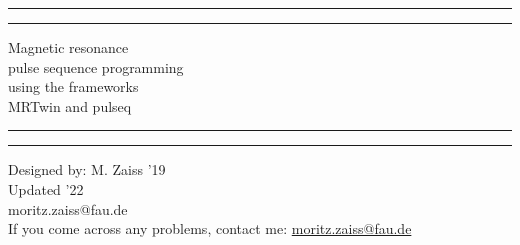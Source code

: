 \documentclass[a4paper,12pt]{extarticle}
\begin{document}

\graphicspath{ {./img/} }
\begin{titlepage}
	\centering %
	\scshape %
	\vspace*{1.5\baselineskip} %

	\rule{13cm}{1.6pt}\vspace*{-\baselineskip}\vspace*{2pt} %
	\rule{13cm}{0.4pt} %
	
		\vspace{0.75\baselineskip} %
		{\Huge Magnetic resonance  \\ 
			\vspace{4mm}
            pulse sequence programming \\
            \vspace{4mm}
	         using the frameworks \\ MRTwin and pulseq \\	
        }
		\vspace{0.75\baselineskip} %
	\rule{13cm}{0.4pt}\vspace*{-\baselineskip}\vspace{3.2pt} %
	\rule{13cm}{1.6pt} %
	
		\vspace{1.75\baselineskip} %
	{\large Designed by: M. Zaiss '19 \\
	Updated '22 \\
		\vspace*{1.2\baselineskip}
	moritz.zaiss@fau.de} \\
	\vfill
If you come across any problems, contact me: \url{moritz.zaiss@fau.de}\\ \vspace{1mm}
\end{titlepage}
\tableofcontents
\vfill
\end{document}
